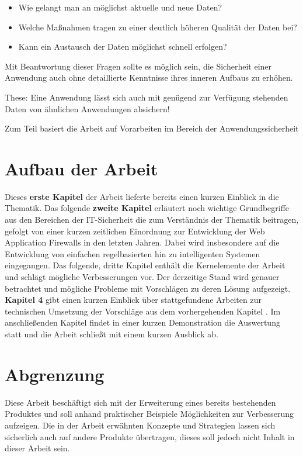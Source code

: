 \begin{itemize}
\item Wie gelangt man an möglichst aktuelle und neue Daten?
\item Welche Maßnahmen tragen zu einer deutlich höheren Qualität der Daten bei?
\item Kann ein Austausch der Daten möglichst schnell erfolgen?
\end{itemize}

Mit Beantwortung dieser Fragen sollte es möglich sein, die Sicherheit einer Anwendung auch ohne detaillierte Kenntnisse ihres inneren Aufbaus zu erhöhen.

\textcolor{bhtGray}{ These:} Eine Anwendung lässt sich auch mit genügend zur Verfügung stehenden Daten von ähnlichen Anwendungen absichern!

Zum Teil basiert die Arbeit auf Vorarbeiten im Bereich der Anwendungssicherheit 


\section{Aufbau der Arbeit}


Dieses \textbf{erste Kapitel} der Arbeit lieferte bereits einen kurzen Einblick in die Thematik. Das folgende \textbf{zweite Kapitel} erläutert noch wichtige Grundbegriffe aus den Bereichen der IT-Sicherheit die zum Verständnis der Thematik beitragen, gefolgt von einer kurzen zeitlichen Einordnung zur Entwicklung der Web Application Firewalls in den letzten Jahren. Dabei wird insbesondere auf die Entwicklung von einfachen regelbasierten hin zu intelligenten Systemen eingegangen. Das folgende, dritte Kapitel enthält die Kernelemente der Arbeit und schlägt mögliche Verbesserungen vor. Der derzeitige Stand wird genauer betrachtet und mögliche Probleme mit Vorschlägen zu deren Lösung aufgezeigt. \textbf{Kapitel 4} gibt einen kurzen Einblick über stattgefundene Arbeiten zur technischen Umsetzung der Vorschläge aus dem vorhergehenden Kapitel . Im anschließenden Kapitel findet in einer kurzen Demonstration die Auswertung statt und die Arbeit schließt mit einem kurzen Ausblick ab.

\section{Abgrenzung}

Diese Arbeit beschäftigt sich mit der Erweiterung eines bereits bestehenden Produktes und soll anhand praktischer Beispiele Möglichkeiten zur Verbesserung aufzeigen. Die in der Arbeit erwähnten Konzepte und Strategien lassen sich sicherlich auch auf andere Produkte übertragen, dieses soll jedoch nicht Inhalt in dieser Arbeit sein.
